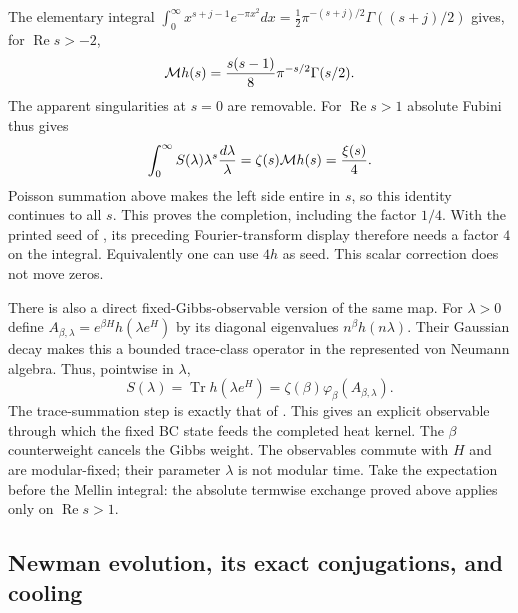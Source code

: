 The elementary integral
$\int_0^\infty x^{s+j-1}e^{-\pi x^2}dx
 =\frac12\pi^{-(s+j)/2}\Gamma((s+j)/2)$ gives, for $\operatorname{Re}s>-2$,
\begin{equation}
 {\cal M}h(s)=\frac{s(s-1)}8\pi^{-s/2}\Gamma(s/2).
 \label{eq:rh-hermite-mellin}
\end{equation}
The apparent singularities at $s=0$ are removable.
For $\operatorname{Re}s>1$ absolute Fubini thus gives
\begin{equation}
 \int_0^\infty S(\lambda)\lambda^s\frac{d\lambda}{\lambda}
 =\zeta(s){\cal M}h(s)=\frac{\xi(s)}4.
 \label{eq:rh-hermite-completion}
\end{equation}
Poisson summation above makes the left side entire in $s$, so this
identity continues to all $s$. This proves the completion, including
the factor $1/4$.
With the printed seed of \cite[\S6.2, (15)]{connes2026}, its preceding
Fourier-transform display therefore needs a factor $4$ on the integral.
Equivalently one can use $4h$ as seed. This scalar correction does not
move zeros.

There is also a direct fixed-Gibbs-observable version of the same map.
For $\lambda>0$ define
$A_{\beta,\lambda}=e^{\beta H}h(\lambda e^H)$ by its diagonal
eigenvalues $n^\beta h(n\lambda)$. Their Gaussian decay makes this a
bounded trace-class operator in the represented von Neumann algebra.
Thus, pointwise in $\lambda$,
\begin{equation}
 S(\lambda)=\operatorname{Tr}h(\lambda e^H)
 =\zeta(\beta)\varphi_\beta(A_{\beta,\lambda}).
 \label{eq:rh-gibbs-hermite}
\end{equation}
The trace-summation step is exactly that of
\cite[\S4.3]{ccmEndomotives}.
This gives an explicit observable through which the fixed BC state
feeds the completed heat kernel. The $\beta$ counterweight cancels
the Gibbs weight. The observables commute with $H$ and are
modular-fixed; their parameter $\lambda$ is not modular time.
Take the expectation before the Mellin integral: the absolute
termwise exchange proved above applies only on $\operatorname{Re}s>1$.

\subsection{Newman evolution, its exact conjugations, and cooling}
\label{sec:rh-newman-maps}

